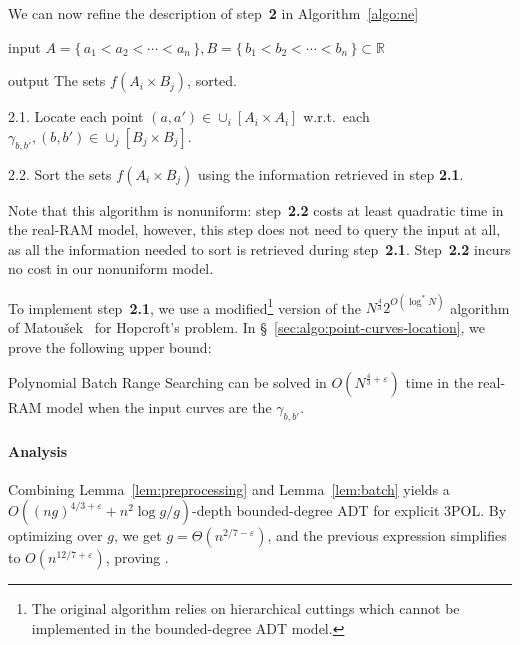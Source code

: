 We can now refine the description of step~\textbf{2} in Algorithm~\ref{algo:ne}
\begin{algorithm}\label{algo:sfaixbj}
\item[input] $A = \{\,a_1<a_2<\cdots<a_n\,\},B = \{\,b_1<b_2<\cdots<b_n\,\}
    \subset \mathbb{R}$
\item[output] The sets $f(A_i \times B_j)$, sorted.
\item[2.1.] Locate each point $(a,a') \in \cup_i [A_i \times A_i]$ w.r.t.\
    each $\gamma_{b,b'}, (b,b') \in \cup_j [B_j \times B_j]$.
\item[2.2.] Sort the sets $f(A_i \times B_j)$ using the
    information retrieved in step \textbf{2.1}.
\end{algorithm}
Note that this algorithm is nonuniform: step~\textbf{2.2} costs at least
quadratic time in the real-RAM model, however, this step does not need to
query the input at all, as all the information needed to sort is retrieved during
step~\textbf{2.1}.
Step~\textbf{2.2} incurs no cost in
our nonuniform model.

To implement step~\textbf{2.1}, we use a modified\footnote{The original
algorithm relies on hierarchical cuttings which cannot be
implemented in the bounded-degree ADT model.}
version of the $N^{\frac{4}{3}} 2^{O(\log^* N)}$ algorithm of
Matou\v{s}ek~\cite{Ma93} for Hopcroft's problem.
In \S~\ref{sec:algo:point-curves-location}, we prove the following upper bound:
\begin{lemma}\label{lem:batch}
Polynomial Batch Range Searching can be solved in
$O(N^{\frac{4}{3}+\varepsilon})$ time in the real-RAM model when the input
curves are the $\gamma_{b,b'}$.
\end{lemma}


\paragraph{Analysis}
Combining Lemma~\ref{lem:preprocessing} and Lemma~\ref{lem:batch} yields a $O(
{(ng)}^{4/3+\varepsilon} + n^2 \log g / g)$-depth bounded-degree ADT for
explicit 3POL\@. By optimizing over $g$, we get $g = \Theta(n^{2/7-\varepsilon})$, and
the previous expression simplifies to $O(n^{12/7+\varepsilon})$, proving
\Cref{thm:explicit:nonuniform}.
